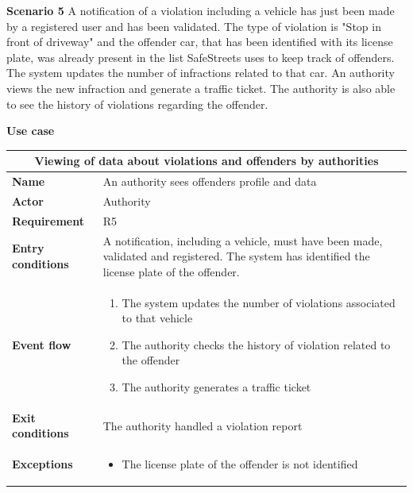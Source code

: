 \begin{description}
    \item \label{scenario5} \textbf{Scenario 5} \newline
        A notification of a violation including a vehicle has just been made by a registered user and has been validated. The type of violation is "Stop in front of driveway" and the offender car, that has been identified with its license plate, was already present in the list SafeStreets uses to keep track of offenders. The system updates the number of infractions related to that car. An authority views the new infraction and generate a traffic ticket. The authority is also able to see the history of violations regarding the offender.

    \item \textbf{Use case}
    \begin{center}
        \begin{tabular}{|p{3cm}|p{7cm}|}
            \multicolumn{2}{c}{\textbf{Viewing of data about violations and offenders by authorities}} \\
            \hline
            \textbf{Name} & An authority sees offenders profile and data \\
            \hline
            \textbf{Actor} & Authority \\
            \hline
            \textbf{Requirement} & R5 \\
            \hline
            \textbf{Entry conditions} & A notification, including a vehicle, must have been made, validated and registered.
            The system has identified the license plate of the offender. \\
            \hline
            \textbf{Event flow} &
            \begin{enumerate}
                \item The system updates the number of violations associated to that vehicle
                \item The authority checks the history of violation related to the offender
                \item The authority generates a traffic ticket
            \end{enumerate} \\
            \hline
            \textbf{Exit conditions} & The authority handled a violation report \\
            \hline
            \textbf{Exceptions}
            & \begin{itemize}
                \item The license plate of the offender is not identified
            \end{itemize} \\
            \hline
        \end{tabular}
    \end{center}
\end{description}

